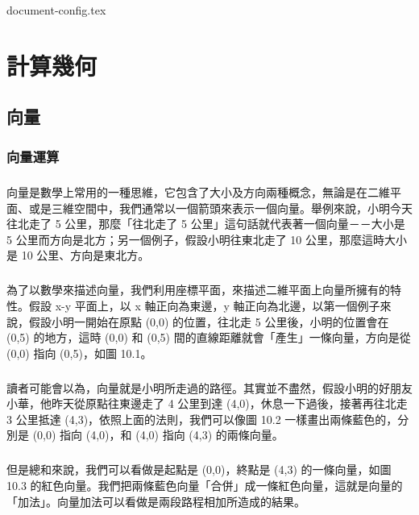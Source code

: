 \documentclass[12pt,a4paper,oneside]{report}
\begin{document}
\begin{CJK}{UTF8}{bkai}

{document-config.tex}
\setcounter{chapter}{9}

\fi

\newcommand{\True}{\textsc{True}}
\newcommand{\False}{\textsc{False}}

\chapter{計算幾何}

\section{向量}
\subsection{向量運算}

\paragraph{}向量是數學上常用的一種思維，它包含了大小及方向兩種概念，無論是在二維平面、或是三維空間中，我們通常以一個箭頭來表示一個向量。舉例來說，小明今天往北走了 5 公里，那麼「往北走了 5 公里」這句話就代表著一個向量－－大小是 5 公里而方向是北方；另一個例子，假設小明往東北走了 10 公里，那麼這時大小是 10 公里、方向是東北方。
\paragraph{}為了以數學來描述向量，我們利用座標平面，來描述二維平面上向量所擁有的特性。假設 x-y 平面上，以 x 軸正向為東邊，y 軸正向為北邊，以第一個例子來說，假設小明一開始在原點 (0,0) 的位置，往北走 5 公里後，小明的位置會在 (0,5) 的地方，這時 (0,0) 和 (0,5) 間的直線距離就會「產生」一條向量，方向是從 (0,0) 指向 (0,5)，如圖 10.1。
\paragraph{}讀者可能會以為，向量就是小明所走過的路徑。其實並不盡然，假設小明的好朋友小華，他昨天從原點往東邊走了 4 公里到達 (4,0)，休息一下過後，接著再往北走 3 公里抵達 (4,3)，依照上面的法則，我們可以像圖 10.2 一樣畫出兩條藍色的，分別是 (0,0) 指向 (4,0)，和 (4,0) 指向 (4,3) 的兩條向量。
\paragraph{}但是總和來說，我們可以看做是起點是 (0,0)，終點是 (4,3) 的一條向量，如圖 10.3 的紅色向量。我們把兩條藍色向量「合併」成一條紅色向量，這就是向量的「加法」。向量加法可以看做是兩段路程相加所造成的結果。

\end{CJK}
\end{document}
